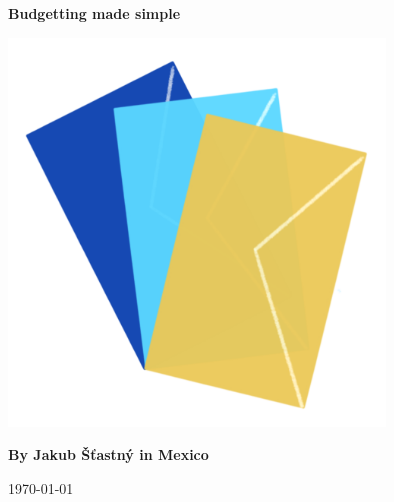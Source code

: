 \pagecolor[HTML]{fdfcd2}

\begin{titlepage}
  \begin{center}

    \textbf{\huge \color{DarkRed} Budgetting made simple}
    \vspace{2cm}

    \includegraphics[width=0.75\textwidth]{"assets/envelopes"}
    \vfill

    \textbf{\large \color{Indigo} By Jakub Šťastný in Mexico}

    \vspace{0.8cm}
    \large\today
  \end{center}
\end{titlepage}

\pagecolor{white}